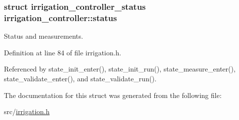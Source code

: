 \subsubsection[{status}]{\setlength{\rightskip}{0pt plus 5cm}struct {\bf irrigation\+\_\+controller\+\_\+status} irrigation\+\_\+controller\+::status}\label{structirrigation__controller_a68a854df15c9234d24f2ad36b990bfa8}


Status and measurements. 



Definition at line 84 of file irrigation.\+h.



Referenced by state\+\_\+init\+\_\+enter(), state\+\_\+init\+\_\+run(), state\+\_\+measure\+\_\+enter(), state\+\_\+validate\+\_\+enter(), and state\+\_\+validate\+\_\+run().



The documentation for this struct was generated from the following file\+:\begin{DoxyCompactItemize}
\item 
src/\hyperlink{irrigation_8h}{irrigation.\+h}\end{DoxyCompactItemize}
